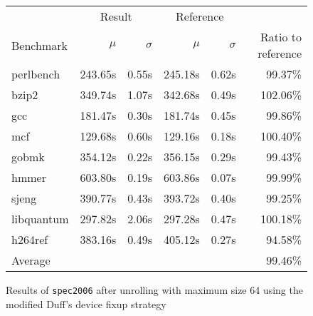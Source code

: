 \begin{figure}[th]
    \begin{center}
        \begin{tabular}{lrrrrr}
            \toprule
            & \multicolumn{2}{c}{Result} & \multicolumn{2}{c}{Reference}\\
            Benchmark & $\mu$ & $\sigma$ & $\mu$ & $\sigma$ & Ratio to reference\\
            \midrule
            perlbench & 243.65s & 0.55s & 245.18s & 0.62s & 99.37\%\\
            bzip2 & 349.74s & 1.07s & 342.68s & 0.49s & 102.06\%\\
            gcc & 181.47s & 0.30s & 181.74s & 0.45s & 99.86\%\\
            mcf & 129.68s & 0.60s & 129.16s & 0.18s & 100.40\%\\
            gobmk & 354.12s & 0.22s & 356.15s & 0.29s & 99.43\%\\
            hmmer & 603.80s & 0.19s & 603.86s & 0.07s & 99.99\%\\
            sjeng & 390.77s & 0.43s & 393.72s & 0.40s & 99.25\%\\
            libquantum & 297.82s & 2.06s & 297.28s & 0.47s & 100.18\%\\
            h264ref & 383.16s & 0.49s & 405.12s & 0.27s & 94.58\%\\
            \midrule
            Average & & & & & 99.46\%\\
            \bottomrule
        \end{tabular}
    \end{center}
    \caption{Results of \texttt{spec2006} after unrolling with maximum size 64 using the modified Duff's device fixup strategy}
    \label{fig:eval:perf:duff:64}
\end{figure}

